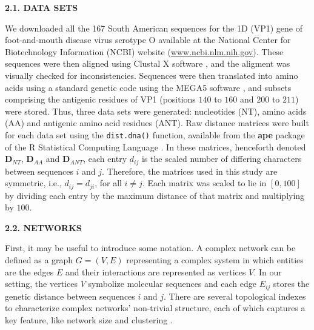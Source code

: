 \documentclass[12pt]{article}
\begin{document}
\bigskip
\bigskip

\textbf{2.1. DATA SETS}

\bigskip
\bigskip

We downloaded all the 167 South American sequences for the 1D (VP1) gene of foot-and-mouth disease virus serotype O available at the National Center for Biotechnology Information (NCBI) website (\url{www.ncbi.nlm.nih.gov}).
These sequences were then aligned using Clustal X software \cite{clustal}, and the aligment was visually checked for inconsistencies. Sequences were then translated into amino acids using a standard genetic code using the MEGA5 software \cite{MEGA}, and subsets comprising the antigenic residues of VP1 (positions $140$ to $160$ and $200$ to $211$) \cite{antigenic} were stored.
Thus, three data sets were generated: nucleotides (NT), amino acids (AA) and antigenic amino acid residues (ANT).
Raw distance matrices were built for each data set using the \verb|dist.dna()| function, available from the \textbf{ape} package of the R Statistical Computing Language \cite{R}.
In these matrices, henceforth denoted $\mathbf{D}_{NT}$, $\mathbf{D}_{AA}$ and $\mathbf{D}_{ANT}$, each entry $d_{ij}$ is the scaled number of differing characters between sequences $i$ and $j$.
Therefore, the matrices used in this study are symmetric, i.e., $d_{ij} = d_{ji}$, for all $i \neq j$.
Each matrix was scaled to lie in $[0,100]$ by dividing each entry by the maximum distance of that matrix and multiplying by $100$.
 
\bigskip
\bigskip

\textbf{2.2. NETWORKS}

\bigskip
\bigskip

First, it may be useful to introduce some notation.
A complex network can be defined as a graph $G=(V,E)$ representing a complex system in which entities are the edges $E$ and their interactions are represented as vertices $V$.
In our setting, the vertices $V$ symbolize molecular sequences and each edge $E_{ij}$ stores the genetic distance between sequences $i$ and $j$.
There are several topological indexes to characterize  complex networks' non-trivial structure, each of which captures a key feature, like network size and clustering \cite{Barabasi2004}.
\end{document}

